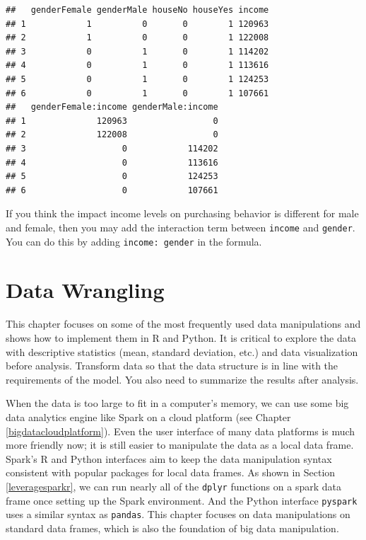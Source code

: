 \documentclass[
  12pt,
]{krantz}
\begin{document}
\begin{verbatim}
##   genderFemale genderMale houseNo houseYes income
## 1            1          0       0        1 120963
## 2            1          0       0        1 122008
## 3            0          1       0        1 114202
## 4            0          1       0        1 113616
## 5            0          1       0        1 124253
## 6            0          1       0        1 107661
##   genderFemale:income genderMale:income
## 1              120963                 0
## 2              122008                 0
## 3                   0            114202
## 4                   0            113616
## 5                   0            124253
## 6                   0            107661
\end{verbatim}

If you think the impact income levels on purchasing behavior is different for male and female, then you may add the interaction term between \texttt{income} and \texttt{gender}. You can do this by adding \texttt{income:\ gender} in the formula.

\hypertarget{datawrangline}{%
\chapter{Data Wrangling}\label{datawrangline}}

This chapter focuses on some of the most frequently used data manipulations and shows how to implement them in R and Python. It is critical to explore the data with descriptive statistics (mean, standard deviation, etc.) and data visualization before analysis. Transform data so that the data structure is in line with the requirements of the model. You also need to summarize the results after analysis.

When the data is too large to fit in a computer's memory, we can use some big data analytics engine like Spark on a cloud platform (see Chapter \ref{bigdatacloudplatform}). Even the user interface of many data platforms is much more friendly now; it is still easier to manipulate the data as a local data frame. Spark's R and Python interfaces aim to keep the data manipulation syntax consistent with popular packages for local data frames. As shown in Section \ref{leveragesparkr}, we can run nearly all of the \texttt{dplyr} functions on a spark data frame once setting up the Spark environment. And the Python interface \texttt{pyspark} uses a similar syntax as \texttt{pandas}. This chapter focuses on data manipulations on standard data frames, which is also the foundation of big data manipulation.
\end{document}
